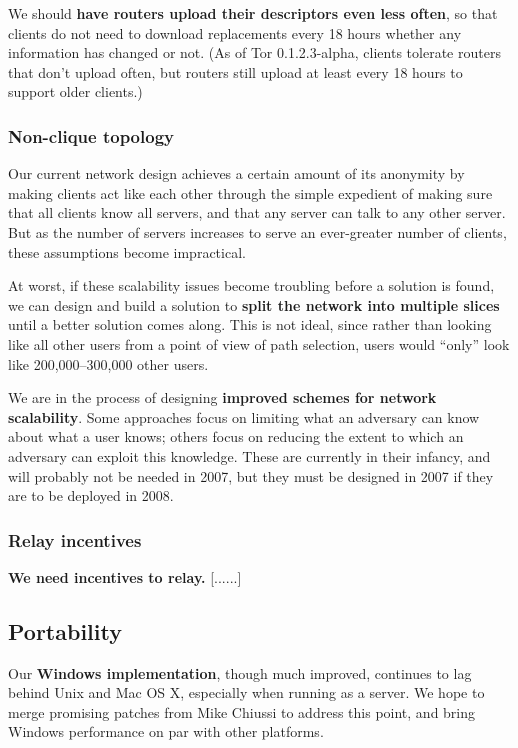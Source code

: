 \documentclass{article}
\newcommand{\tmp}[1]{{\bf #1} [......] \\}
\begin{document}
We should {\bf have routers upload their descriptors even less often}, so
that clients do not need to download replacements every 18 hours whether any
information has changed or not.  (As of Tor 0.1.2.3-alpha, clients tolerate
routers that don't upload often, but routers still upload at least every 18
hours to support older clients.)

\subsubsection{Non-clique topology}
Our current network design achieves a certain amount of its anonymity by
making clients act like each other through the simple expedient of making
sure that all clients know all servers, and that any server can talk to any
other server.  But as the number of servers increases to serve an
ever-greater number of clients, these assumptions become impractical.

At worst, if these scalability issues become troubling before a solution is
found, we can design and build a solution to {\bf split the network into
multiple slices} until a better solution comes along.  This is not ideal,
since rather than looking like all other users from a point of view of path
selection, users would ``only'' look like 200,000--300,000 other users.

We are in the process of designing {\bf improved schemes for network
  scalability}.  Some approaches focus on limiting what an adversary can know
about what a user knows; others focus on reducing the extent to which an
adversary can exploit this knowledge.  These are currently in their infancy,
and will probably not be needed in 2007, but they must be designed in 2007 if
they are to be deployed in 2008.

\subsubsection{Relay incentives}

\tmp{We need incentives to relay.}

\subsection{Portability}
Our {\bf Windows implementation}, though much improved, continues to lag
behind Unix and Mac OS X, especially when running as a server.  We hope to
merge promising patches from Mike Chiussi to address this point, and bring
Windows performance on par with other platforms.
\end{document}
